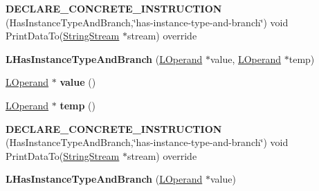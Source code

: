 \begin{DoxyCompactItemize}
\item 
{\bfseries D\+E\+C\+L\+A\+R\+E\+\_\+\+C\+O\+N\+C\+R\+E\+T\+E\+\_\+\+I\+N\+S\+T\+R\+U\+C\+T\+I\+ON} (Has\+Instance\+Type\+And\+Branch,\char`\"{}has-\/instance-\/type-\/and-\/branch\char`\"{}) void Print\+Data\+To(\hyperlink{classv8_1_1internal_1_1_string_stream}{String\+Stream} $\ast$stream) override\hypertarget{classv8_1_1internal_1_1_l_has_instance_type_and_branch_a3d0add74c6215d7b2c0629955bf970a3}{}\label{classv8_1_1internal_1_1_l_has_instance_type_and_branch_a3d0add74c6215d7b2c0629955bf970a3}

\item 
{\bfseries L\+Has\+Instance\+Type\+And\+Branch} (\hyperlink{classv8_1_1internal_1_1_l_operand}{L\+Operand} $\ast$value, \hyperlink{classv8_1_1internal_1_1_l_operand}{L\+Operand} $\ast$temp)\hypertarget{classv8_1_1internal_1_1_l_has_instance_type_and_branch_a724bc7736ff63c67353a3b18169626c5}{}\label{classv8_1_1internal_1_1_l_has_instance_type_and_branch_a724bc7736ff63c67353a3b18169626c5}

\item 
\hyperlink{classv8_1_1internal_1_1_l_operand}{L\+Operand} $\ast$ {\bfseries value} ()\hypertarget{classv8_1_1internal_1_1_l_has_instance_type_and_branch_a33c5f4ece667b3cc856cdba5e0ffa217}{}\label{classv8_1_1internal_1_1_l_has_instance_type_and_branch_a33c5f4ece667b3cc856cdba5e0ffa217}

\item 
\hyperlink{classv8_1_1internal_1_1_l_operand}{L\+Operand} $\ast$ {\bfseries temp} ()\hypertarget{classv8_1_1internal_1_1_l_has_instance_type_and_branch_a8cdfd4f289c9986c7e237c421380072f}{}\label{classv8_1_1internal_1_1_l_has_instance_type_and_branch_a8cdfd4f289c9986c7e237c421380072f}

\item 
{\bfseries D\+E\+C\+L\+A\+R\+E\+\_\+\+C\+O\+N\+C\+R\+E\+T\+E\+\_\+\+I\+N\+S\+T\+R\+U\+C\+T\+I\+ON} (Has\+Instance\+Type\+And\+Branch,\char`\"{}has-\/instance-\/type-\/and-\/branch\char`\"{}) void Print\+Data\+To(\hyperlink{classv8_1_1internal_1_1_string_stream}{String\+Stream} $\ast$stream) override\hypertarget{classv8_1_1internal_1_1_l_has_instance_type_and_branch_a3d0add74c6215d7b2c0629955bf970a3}{}\label{classv8_1_1internal_1_1_l_has_instance_type_and_branch_a3d0add74c6215d7b2c0629955bf970a3}

\item 
{\bfseries L\+Has\+Instance\+Type\+And\+Branch} (\hyperlink{classv8_1_1internal_1_1_l_operand}{L\+Operand} $\ast$value)\hypertarget{classv8_1_1internal_1_1_l_has_instance_type_and_branch_aa3a1c79111e30f9b59c15e5d022becdf}{}\label{classv8_1_1internal_1_1_l_has_instance_type_and_branch_aa3a1c79111e30f9b59c15e5d022becdf}


\end{DoxyCompactItemize}
